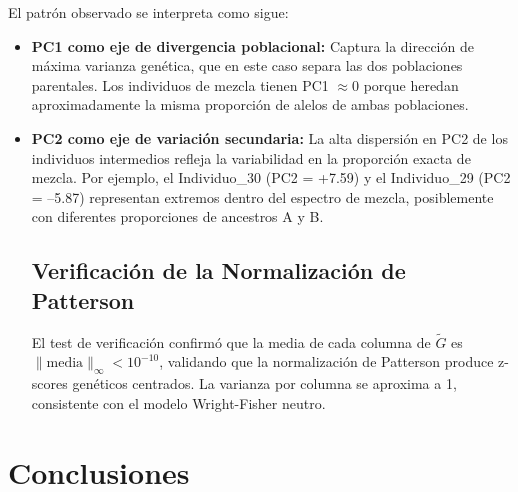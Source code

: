 \documentclass[12pt,a4paper]{article}
\theoremstyle{definition}
\begin{document}
El patr\'{o}n observado se interpreta como sigue:

\begin{itemize}
    \item \textbf{PC1 como eje de divergencia poblacional:} Captura la direcci\'{o}n de m\'{a}xima varianza gen\'{e}tica, que en este caso separa las dos poblaciones parentales. Los individuos de mezcla tienen PC1 $\approx 0$ porque heredan aproximadamente la misma proporci\'{o}n de alelos de ambas poblaciones.
    
    \item \textbf{PC2 como eje de variaci\'{o}n secundaria:} La alta dispersi\'{o}n en PC2 de los individuos intermedios refleja la variabilidad en la proporci\'{o}n exacta de mezcla. Por ejemplo, el Individuo\_30 (PC2 = +7.59) y el Individuo\_29 (PC2 = --5.87) representan extremos dentro del espectro de mezcla, posiblemente con diferentes proporciones de ancestros A y B.
    

\subsection{Verificaci\'{o}n de la Normalizaci\'{o}n de Patterson}

El test de verificaci\'{o}n confirm\'{o} que la media de cada columna de $\tilde{G}$ es $\|\text{media}\|_\infty < 10^{-10}$, validando que la normalizaci\'{o}n de Patterson produce z-scores gen\'{e}ticos centrados. La varianza por columna se aproxima a 1, consistente con el modelo Wright-Fisher neutro.

\end{itemize}

\section{Conclusiones}\label{sec:conclusiones}
\end{document}
